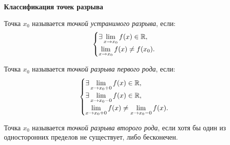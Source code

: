 \textbf{Классификация точек разрыва}
\begin{definition}
     Точка $x_0$ называется \textit{точкой устранимого разрыва}, если:
    $$ \begin{cases}
            \exists \lim\limits_{x \to x_{0}} f(x) \in \mathbb{R},\\
            \lim\limits_{x \to x_{0}} f(x) \neq f(x_{0}).
    \end{cases}$$
\end{definition}
\begin{definition}
    Точка $x_0$ называется \textit{точкой разрыва первого рода}, если:
    $$
    \begin{cases}
        \exists \lim\limits_{x \to x_{0} +0} f(x) \in \mathbb{R},\\
        \exists \lim\limits_{x \to x_{0} -0} f(x) \in \mathbb{R},\\
        \lim\limits_{x \to x_{0} +0} f(x) \neq \lim\limits_{x \to x_{0} -0} f(x).
    \end{cases}
    $$
\end{definition}
\begin{definition}
    Точка $x_0$ называется \textit{точкой разрыва второго рода}, если хотя бы один из односторонних пределов не существует, либо бесконечен.
\end{definition}


